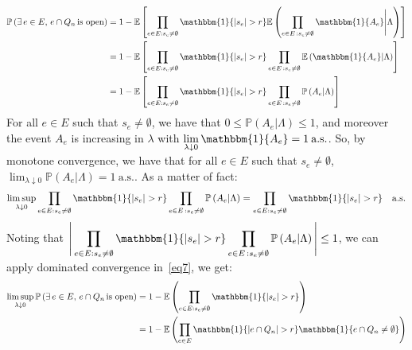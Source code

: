 \documentclass[10pt,a4paper]{amsart}
\theoremstyle{exampstyle}
\theoremstyle{exampnotations}
\begin{document}
\begin{align}
     \nonumber \mathbb{P}\left(\exists \, e \in E, \, e \cap Q_n \, \text{is open} \right) &= 1 - \mathbb{E}\left[\prod_{e \in E : s_e \neq \emptyset} \mathbbm{1}\lbrace \vert s_e \vert > r \rbrace\mathbb{E}\left( \prod_{e \in E \, : s_e \neq \emptyset}  \mathbbm{1}\lbrace A_e \rbrace  \Bigg\vert \Lambda \right) \right] \\ \nonumber &= 1 - \mathbb{E}\left[\prod_{e \in E : s_e \neq \emptyset} \mathbbm{1}\lbrace \vert s_e \vert > r \rbrace \prod_{e \in E \, : s_e \neq \emptyset}\mathbb{E}\left(   \mathbbm{1}\lbrace A_e \rbrace  \vert \Lambda \right) \right] \\ \label{eq7} &= 1 - \mathbb{E}\left[\prod_{e \in E : s_e \neq \emptyset} \mathbbm{1}\lbrace \vert s_e \vert > r \rbrace \prod_{e \in E \, : s_e \neq \emptyset}\mathbb{P}\left( A_e  \vert \Lambda \right) \right] 
\end{align}
For all $e \in E$ such that $s_e \neq \emptyset$, we have that $0 \leq \mathbb{P}(A_e \vert \Lambda) \leq 1$, and moreover the event $A_e$ is increasing in $\lambda$ with $\displaystyle \lim_{\lambda \downarrow 0} \mathbbm{1}\lbrace A_e \rbrace = 1 \: \text{a.s.}$. So, by monotone convergence, we have that for all $e \in E$ such that $s_e \neq \emptyset$, $\displaystyle \lim_{\lambda \downarrow 0} \mathbb{P}(A_e \vert \Lambda) = 1 \: \text{a.s.}$. As a matter of fact:
\begin{equation*}
    \limsup_{\lambda \downarrow 0} \prod_{e \in E : s_e \neq \emptyset} \mathbbm{1}\lbrace \vert s_e \vert > r \rbrace \prod_{e \in E \, : s_e \neq \emptyset}\mathbb{P}\left(    A_e  \vert \Lambda \right) = \prod_{e \in E : s_e \neq \emptyset} \mathbbm{1}\lbrace \vert s_e \vert > r \rbrace \quad \text{a.s.}
\end{equation*}
Noting that $\displaystyle \Bigg\lvert \prod_{e \in E : s_e \neq \emptyset} \mathbbm{1}\lbrace \vert s_e \vert > r \rbrace \prod_{e \in E \, : s_e \neq \emptyset}\mathbb{P}\left(    A_e  \vert \Lambda \right) \Bigg\rvert \leq 1$, we can apply dominated convergence in~\eqref{eq7}, we get:
\begin{align}
   \nonumber  \limsup_{\lambda \downarrow 0} \mathbb{P}\left(\exists \, e \in E, \, e \cap Q_n \, \text{is open} \right) &= 1 - \mathbb{E}\left(\prod_{e \in E : s_e \neq \emptyset} \mathbbm{1}\lbrace \vert s_e \vert > r \rbrace \right) \\ \label{eq8} &= 1 - \mathbb{E}\left(\prod_{e \in E} \mathbbm{1}\lbrace \vert e \cap Q_n \vert > r \rbrace \mathbbm{1} \lbrace e \cap Q_n \neq \emptyset \rbrace \right)
\end{align}
\end{document}
